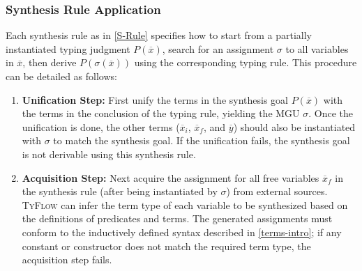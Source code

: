 \documentclass[manuscript,screen]{acmart}
\newcommand{\meta}[1]{
  \ensuremath{%
    #1
  }
}
\newcommand{\skhzc}[1]{#1}
\newcommand{\toolname}[1]{\textsc{#1}}
\newcommand{\mainname}{\toolname{TyFlow}\xspace}
\begin{document}
\subsubsection{Synthesis Rule Application}
\label{sec:synthesis-rule-application}
Each synthesis rule as in \autoref{S-Rule} specifies how to start from a partially instantiated typing judgment $P(\overline{x})$, search for an assignment $\sigma$ to all variables in $\overline{x}$, then derive $P(\sigma(\overline{x}))$ using the corresponding typing rule. This procedure can be detailed as follows:
\begin{enumerate}
    \item \textbf{Unification Step:} First unify the terms in the synthesis goal $P(\overline{x})$ with the terms in the conclusion of the typing rule, yielding the MGU $\sigma$. Once the unification is done, the other terms ($\overline{x}_i$, $\overline{x}_f$, and $\overline{y}$) should also be instantiated with $\sigma$ to match the synthesis goal.    {\color{revblue}If } the unification fails,   the synthesis goal is not derivable using this synthesis rule.


    \item \textbf{Acquisition Step:} Next acquire the assignment for all free variables $\overline{x}_f$ in the synthesis    {\color{revblue}rule (after being } instantiated by $\sigma$) from external sources. 
    \mainname can infer the term type of each variable to be synthesized based on the definitions of predicates and terms. The generated assignments must conform to the inductively defined syntax described in \autoref{terms-intro}; if any constant or constructor does not match the required term type, the acquisition step fails.



\end{enumerate}
\end{document}
